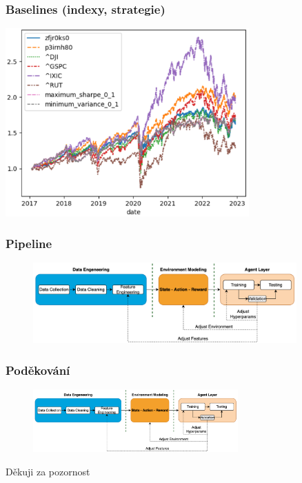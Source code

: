 \begin{frame}
    \frametitle{Baselines (indexy, strategie)}
    \begin{center}
        \centering
        \includegraphics[width=0.7\textwidth]{img/returns}
    \end{center}
\end{frame}

\begin{frame}
    \frametitle{Pipeline}
    \begin{center}
        \begin{figure}
            \centering
            \includegraphics[width=0.9\textwidth]{img/navrh_reseni}
        \end{figure}
    \end{center}
\end{frame}

\begin{frame}
    \frametitle{Poděkování}
    \begin{center}
        \begin{figure}
            \centering
            \includegraphics[width=0.7\textwidth]{img/navrh_reseni}
        \end{figure}
        \vspace{0.5cm}
        \Huge Děkuji za pozornost
    \end{center}
\end{frame}

